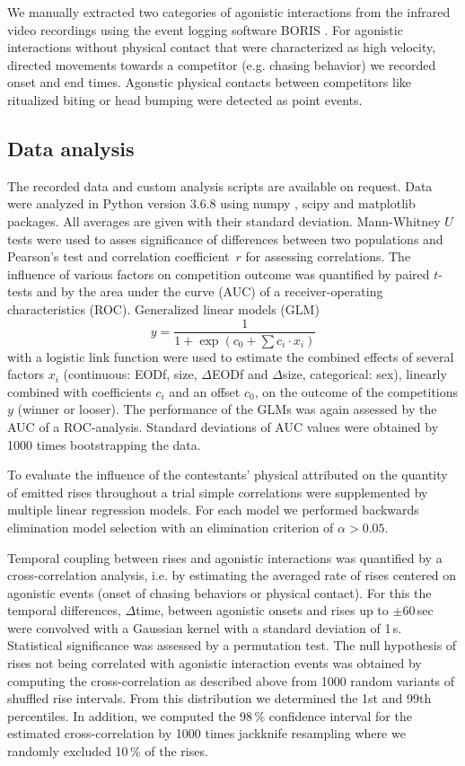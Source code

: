 \documentclass[vruler,JEB]{COB}%
\begin{document}
We manually extracted two categories of agonistic interactions from the infrared video recordings using the event logging software BORIS \citep{Friard2016}. For agonistic interactions without physical contact that were characterized as high velocity, directed movements towards a competitor (e.g. chasing behavior) we recorded onset and end times. Agonstic physical contacts between competitors like ritualized biting or head bumping were detected as point events.   

\subsection{Data analysis}

The recorded data and custom analysis scripts are available on request.
Data were analyzed in Python version 3.6.8 using numpy \citep{vanderWalt2011}, scipy \citep{Oliphant2007} and matplotlib \citep{Hunter2007} packages. All averages are given with their standard deviation. Mann-Whitney $U$ tests were used to asses significance of differences between two populations and Pearson's test and correlation coefficient~$r$ for assessing correlations. The influence of various factors on competition outcome was quantified by paired $t$-tests and by the area under the curve (AUC) of a receiver-operating characteristics (ROC). Generalized linear models (GLM)
\begin{equation}
 \label{glmmodel}
 y = \frac{1}{1 + \exp{(c_0 + \sum c_i \cdot x_i)}}
\end{equation}
with a logistic link function were used to estimate the combined effects of several factors $x_i$ (continuous: EODf, size, $\Delta$EODf and $\Delta$size, categorical: sex), linearly combined with coefficients $c_i$ and an offset $c_0$, on the outcome of the competitions $y$ (winner or looser). The performance of the GLMs was again assessed by the AUC of a ROC-analysis. Standard deviations of AUC values were obtained by 1000 times bootstrapping the data.

To evaluate the influence of the contestants' physical attributed on the quantity of emitted rises throughout a trial simple correlations were supplemented by multiple linear regression models. For each model we performed backwards elimination model selection with an elimination criterion of $\alpha > 0.05$.

Temporal coupling between rises and agonistic interactions was quantified by a cross-correlation analysis, i.e. by estimating the averaged rate of rises centered on agonistic events (onset of chasing behaviors or physical contact). For this the temporal differences, $\Delta$time, between agonistic onsets and rises up to $\pm 60$\,sec were convolved with a Gaussian kernel with a standard deviation of 1\,s. Statistical significance was assessed by a permutation test. The null hypothesis of rises not being correlated with agonistic interaction events was obtained by computing the cross-correlation as described above from 1000 random variants of shuffled  rise intervals. From this distribution we determined the 1st and 99th percentiles. In addition, we computed the 98\,\% confidence interval for the estimated cross-correlation by 1000 times jackknife resampling where we randomly excluded 10\,\% of the rises.
\end{document}
